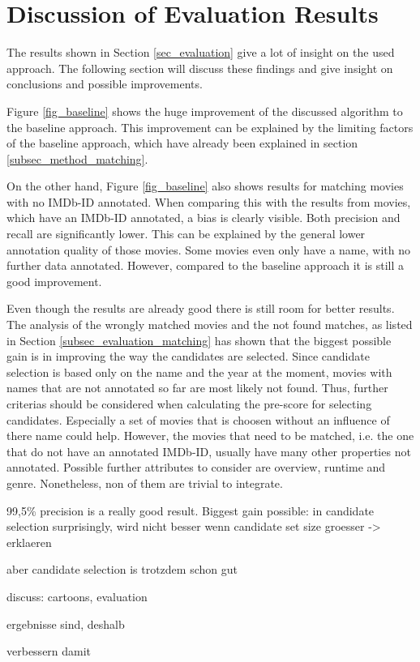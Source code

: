 \section{Discussion of Evaluation Results}
\label{sec_discussion}

The results shown in Section \ref{sec_evaluation} give a lot of insight on the used approach.
The following section will discuss these findings and give insight on conclusions and possible improvements.

Figure \ref{fig_baseline} shows the huge improvement of the discussed algorithm to the baseline approach.
This improvement can be explained by the limiting factors of the baseline approach, which have already been explained in section \ref{subsec_method_matching}.

On the other hand, Figure \ref{fig_baseline} also shows results for matching movies with no IMDb-ID annotated.
When comparing this with the results from movies, which have an IMDb-ID annotated, a bias is clearly visible.
Both precision and recall are significantly lower.
This can be explained by the general lower annotation quality of those movies.
Some movies even only have a name, with no further data annotated.
However, compared to the baseline approach it is still a good improvement.

Even though the results are already good there is still room for better results.
The analysis of the wrongly matched movies and the not found matches, as listed in Section \ref{subsec_evaluation_matching} has shown that the biggest possible gain is in improving the way the candidates are selected.
Since candidate selection is based only on the name and the year at the moment, movies with names that are not annotated so far are most likely not found.
Thus, further criterias should be considered when calculating the pre-score for selecting candidates.
Especially a set of movies that is choosen without an influence of there name could help.
However, the movies that need to be matched, i.e. the one that do not have an annotated IMDb-ID, usually have many other properties not annotated.
Possible further attributes to consider are overview, runtime and genre.
Nonetheless, non of them are trivial to integrate.

99,5\% precision is a really good result.
Biggest gain possible: in candidate selection
surprisingly, wird nicht besser wenn candidate set size groesser -> erklaeren

aber candidate selection is trotzdem schon gut

discuss: cartoons, evaluation

ergebnisse sind, deshalb

verbessern damit

